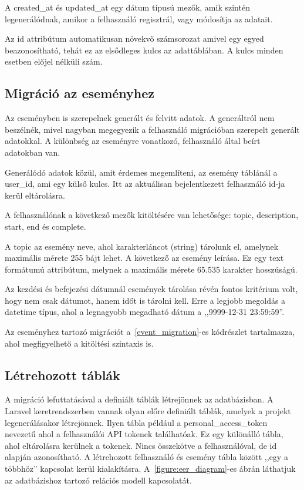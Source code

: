 \documentclass[
]{thesis-ekf}
\theoremstyle{definition}
\theoremstyle{remark}
\begin{document}
	A created\_at és updated\_at egy dátum típusú mezők, amik szintén legenerálódnak, amikor a felhasználó regisztrál, vagy módosítja az adatait. 
	
	Az id attribútum automatikusan növekvő számsorozat amivel egy egyed beazonosítható, tehát ez az elsődleges kulcs az adattáblában.  A kulcs minden esetben előjel nélküli szám.
	
	\subsection{Migráció az eseményhez}
	Az eseményben is szerepelnek generált és felvitt adatok. A generáltról nem beszélnék, mivel nagyban megegyezik a felhasználó migrációban szerepelt generált adatokkal. A különbség az eseményre vonatkozó, felhasználó által beírt adatokban van. 
	
	Generálódó adatok közül, amit érdemes megemlíteni, az esemény táblánál a user\_id, ami egy külső kulcs. Itt az aktuálisan bejelentkezett felhasználó id-ja kerül eltárolásra. 
	
	A felhasználónak a következő mezők kitöltésére van lehetősége: topic, description, start, end és complete. 
	
	A topic az esemény neve, ahol karakterláncot (string) tárolunk el, amelynek maximális mérete 255 bájt lehet. A következő az esemény leírása. Ez egy text formátumú attribútum, melynek a maximális mérete 65.535 karakter hosszúságú.
	
	Az kezdési és befejezési dátumnál események tárolása révén fontos kritérium volt, hogy nem csak dátumot, hanem időt is tárolni kell. Erre a legjobb megoldás a datetime típus, ahol a legnagyobb megadható dátum a ,,9999-12-31 23:59:59''.
	
	Az eseményhez tartozó migrációt a~\ref{event_migration}-es kódrészlet tartalmazza, ahol megfigyelhető a kitöltési szintaxis is. 
	
	
	
	\subsection{Létrehozott táblák}
	A migráció lefuttatásával a definiált táblák létrejönnek az adatbázisban. A Laravel keretrendszerben vannak olyan előre definiált táblák, amelyek a projekt legenerálásakor létrejönnek. Ilyen tábla például a personal\_access\_token nevezetű ahol a felhasználói API tokenek találhatóak. Ez egy különálló tábla, ahol eltárolásra kerülnek a tokenek. Nincs összekötve a felhasználóval, de id alapján azonosítható. A létrehozott felhasználó és esemény tábla között ,,egy a többhöz'' kapcsolat kerül kialakításra. A~\ref{figure:eer_diagram}-es ábrán láthatjuk az adatbázishoz tartozó relációs modell kapcsolatát.
	
\end{document}
